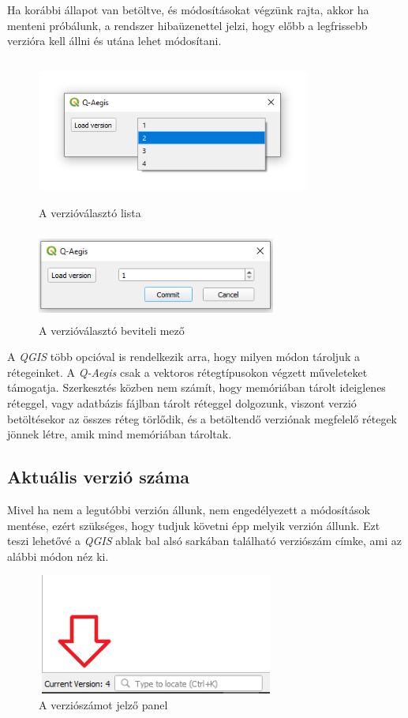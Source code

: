 Ha korábbi állapot van betöltve, és módosításokat végzünk rajta, akkor ha menteni próbálunk, a rendszer hibaüzenettel jelzi, hogy előbb a legfrissebb verzióra kell állni és utána lehet módosítani.
\begin{figure}[H]
	\centering
	\includegraphics[width=0.8\textwidth,height=180px]{images/version_combobox.png}
	\caption{A verzióválasztó lista}
	\label{fig:picture-4}
\end{figure}
\begin{figure}[H]
	\centering
	\includegraphics[width=0.7\textwidth,height=110px]{images/version_spinner.png}
	\caption{A verzióválasztó beviteli mező}
	\label{fig:picture-5}
\end{figure}

\begin{note}
A \emph{QGIS} több opcióval is rendelkezik arra, hogy milyen módon tároljuk a rétegeinket. A \emph{Q-Aegis} csak a vektoros rétegtípusokon végzett műveleteket támogatja. Szerkesztés közben nem számít, hogy memóriában tárolt ideiglenes réteggel, vagy adatbázis fájlban tárolt réteggel dolgozunk, viszont verzió betöltésekor az összes réteg törlődik, és a betöltendő verziónak megfelelő rétegek jönnek létre, amik mind memóriában tároltak.

\end{note}

\subsection{Aktuális verzió száma}
Mivel ha nem a legutóbbi verzión állunk, nem engedélyezett a módosítások mentése, ezért szükséges, hogy tudjuk követni épp melyik verzión állunk. Ezt teszi lehetővé a \emph{QGIS} ablak bal alsó sarkában található verziószám címke, ami az alábbi módon néz ki.
\begin{figure}[H]
	\centering
	\includegraphics[width=0.7\textwidth,height=150px,frame]{images/version_display.png}
	\caption{A verziószámot jelző panel}
	\label{fig:picture-6}
\end{figure}


